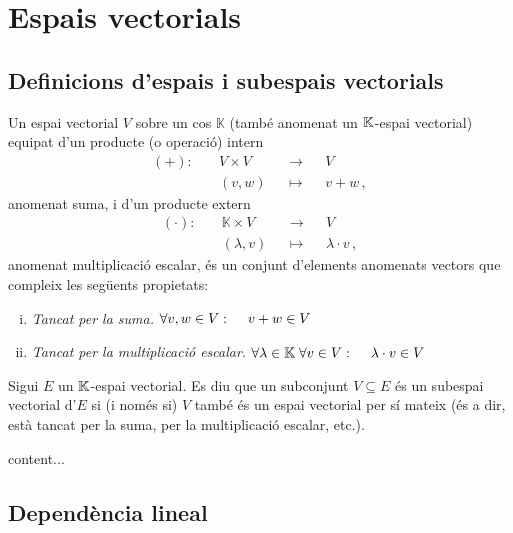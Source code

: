 \chapter{Espais vectorials}
\section{Definicions d'espais i subespais vectorials}
\begin{defi}
	Un espai vectorial $V$ sobre un cos $\mathbb{K}$ (també anomenat un $\mathbb{K}$-espai vectorial) equipat d'un producte (o operació) intern
	\begin{equation*}
	\begin{aligned}
		(+)\colon\quad	&V\times V &&\rightarrow&& V\\
						&(v,w) &&\mapsto&& v+w \,,
	\end{aligned}
	\end{equation*}
	anomenat suma, i d'un producte extern
	\begin{equation*}
	\begin{aligned}
		(\cdot)\colon\quad	&\mathbb{K}\times V &&\rightarrow&& V\\
							&(\lambda,v) &&\mapsto&& \lambda\cdot v\,,
	\end{aligned}
	\end{equation*} 
	anomenat multiplicació escalar, és un conjunt d'elements anomenats vectors que compleix les següents propietats:
	\begin{enumerate}[i)]
		\item \textit{Tancat per la suma.} $\forall v,w \in V\operatorname{\colon\quad} v+w\in V$
		\item \textit{Tancat per la multiplicació escalar.} $\forall \lambda \in \mathbb{K}\; \forall v \in V\operatorname{\colon\quad} \lambda\cdot v\in V$
	\end{enumerate}
\end{defi}

\begin{defi}
	Sigui $E$ un $\mathbb{K}$-espai vectorial. Es diu que un subconjunt $V\subseteq E$ és un subespai vectorial d'$E$ si (i només si) $V$ també és un espai vectorial per sí mateix (és a dir, està tancat per la suma, per la multiplicació escalar, etc.).
\end{defi}

\begin{prop}
	content...
\end{prop}

\section{Dependència lineal}

